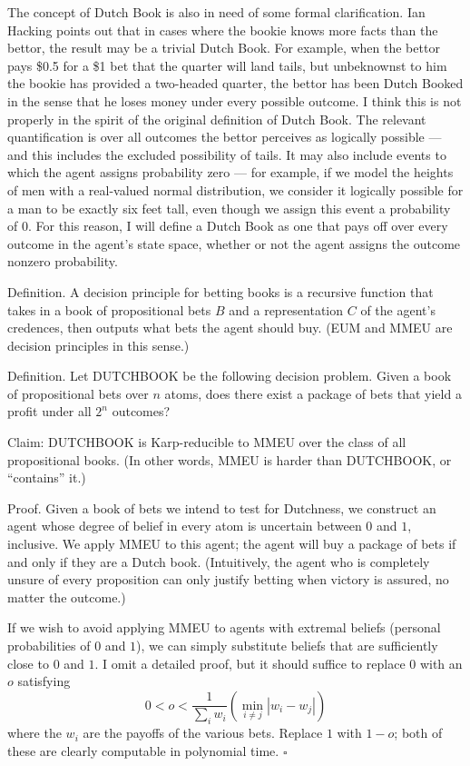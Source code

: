 \documentclass[letterpaper,12pt]{article}
\begin{document}
The concept of Dutch Book is also in need of some formal clarification. Ian Hacking points out that in cases where the bookie knows more facts than the bettor, the result may be a trivial Dutch Book. For example, when the bettor pays \$0.5 for a \$1 bet that the quarter will land tails, but unbeknownst to him the bookie has provided a two-headed quarter, the bettor has been Dutch Booked in the sense that he loses money under every possible outcome. I think this is not properly in the spirit of the original definition of Dutch Book. The relevant quantification is over all outcomes the bettor perceives as logically possible --- and this includes the excluded possibility of tails. It may also include events to which the agent assigns probability zero --- for example, if we model the heights of men with a real-valued normal distribution, we consider it logically possible for a man to be exactly six feet tall, even though we assign this event a probability of 0. For this reason, I will define a Dutch Book as one that pays off over every outcome in the agent's state space, whether or not the agent assigns the outcome nonzero probability.

Definition. A decision principle for betting books is a recursive function that takes in a book of propositional bets $B$ and a representation $C$ of the agent's credences, then outputs what bets the agent should buy. (EUM and MMEU are decision principles in this sense.)

Definition. Let DUTCHBOOK be the following decision problem. Given a book of propositional bets over $n$ atoms, does there exist a package of bets that yield a profit under all $2^n$ outcomes?

Claim: DUTCHBOOK is Karp-reducible to MMEU over the class of all propositional books. (In other words, MMEU is harder than DUTCHBOOK, or ``contains'' it.)

Proof. Given a book of bets we intend to test for Dutchness, we construct an agent whose degree of belief in every atom is uncertain between $0$ and $1$, inclusive. We apply MMEU to this agent; the agent will buy a package of bets if and only if they are a Dutch book. (Intuitively, the agent who is completely unsure of every proposition can only justify betting when victory is assured, no matter the outcome.)

If we wish to avoid applying MMEU to agents with extremal beliefs (personal probabilities of $0$ and $1$), we can simply substitute beliefs that are sufficiently close to $0$ and $1$. I omit a detailed proof, but it should suffice to replace $0$ with an $o$ satisfying
$$0 < o < \frac{1}{\sum_i w_i} (\min_{i\not = j} |w_i - w_j|)$$
where the $w_i$ are the payoffs of the various bets. Replace $1$ with $1 - o$; both of these are clearly computable in polynomial time. $\square$
\end{document}

